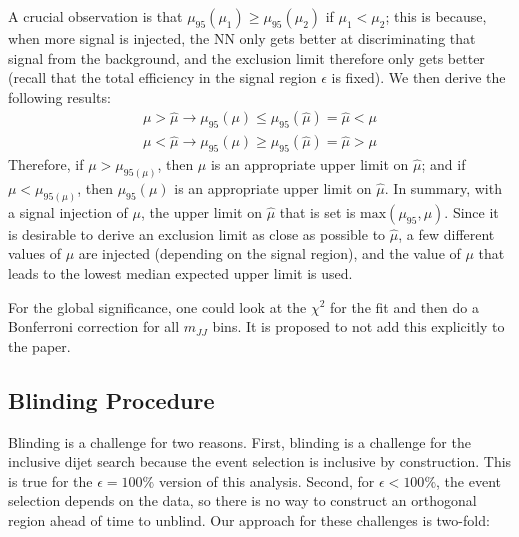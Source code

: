 A crucial observation is that $\mu_{95}(\mu_1) \ge \mu_{95}(\mu_2)$ if $\mu_1<\mu_2$; this is because, when more signal is injected, the NN only gets better at discriminating that signal from the background, and the exclusion limit therefore only gets better (recall that the total efficiency in the signal region $\epsilon$ is fixed).
We then derive the following results:
\begin{align}
  \mu > \hat{\mu} \rightarrow \mu_{95}(\mu) \le \mu_{95}(\hat{\mu}) = \hat{\mu} < \mu \\
  \mu < \hat{\mu} \rightarrow \mu_{95}(\mu) \ge \mu_{95}(\hat{\mu}) = \hat{\mu} > \mu
\end{align}
Therefore, if $\mu>\mu_{95(\mu)}$, then $\mu$ is an appropriate upper limit on $\hat{\mu}$; and if $\mu<\mu_{95(\mu)}$, then $\mu_{95}(\mu)$ is an appropriate upper limit on $\hat{\mu}$.
In summary, with a signal injection of $\mu$, the upper limit on $\hat{\mu}$ that is set is $\text{max}\left(\mu_{95},\mu\right)$.
Since it is desirable to derive an exclusion limit as close as possible to $\hat{\mu}$, a few different values of $\mu$ are injected (depending on the signal region), and the value of $\mu$ that leads to the lowest median expected upper limit is used.


For the global significance, one could look at the $\chi^2$ for the fit and then do a Bonferroni correction for all $m_{JJ}$ bins. It is proposed to not add this explicitly to the paper.

\subsection{Blinding Procedure}

Blinding is a challenge for two reasons.  First, blinding is a challenge for the inclusive dijet search because the event selection is inclusive by construction.  This is true for the $\epsilon=100\%$ version of this analysis.  Second, for $\epsilon < 100\%$, the event selection depends on the data, so there is no way to construct an orthogonal region ahead of time to unblind.   Our approach for these challenges is two-fold:

